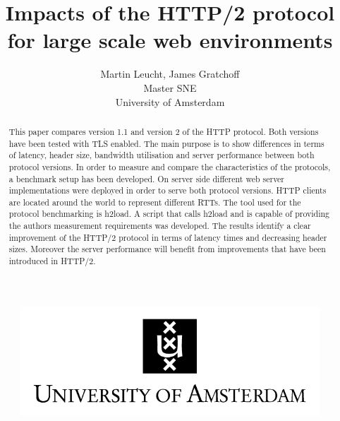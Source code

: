 \documentclass[10pt]{article}
\begin{document}
 
\begin{figure}[!bh]
 	\begin{center}
 	 
 		\huge \title{Impacts of the HTTP/2 protocol for large scale web environments}
		\author{Martin Leucht, James Gratchoff \\
		Master SNE \\ University of Amsterdam} 
		\includegraphics{images/uva.jpeg}
	\maketitle 
		\label{sec:uva}
	\end{center}
\end{figure}
\setlength{\columnsep}{2cm}
\def\columnseprulecolor{\color{blue}}
 
\newpage
\begin{abstract}
This paper compares version 1.1 and version 2 of the HTTP protocol. Both versions have been tested with TLS enabled. The main purpose is to show differences in terms of latency, header size, bandwidth utilisation and server performance between both protocol versions. In order to measure and compare the characteristics of the protocols, a benchmark setup has been developed. On server side different web server implementations were deployed in order to serve both protocol versions. HTTP clients are located around the world to represent different RTTs. The tool used for the protocol benchmarking is h2load. A script that calls h2load and is capable of providing the authors measurement requirements was developed. The results identify a clear improvement of the HTTP/2 protocol in terms of latency times and decreasing header sizes. Moreover the server performance will benefit from improvements that have been introduced in HTTP/2.
\end{abstract}

\newpage
\tableofcontents

\newpage
\newpage


\newpage





\newpage




\newpage

\newpage

\newpage

\newpage

\end{document}
